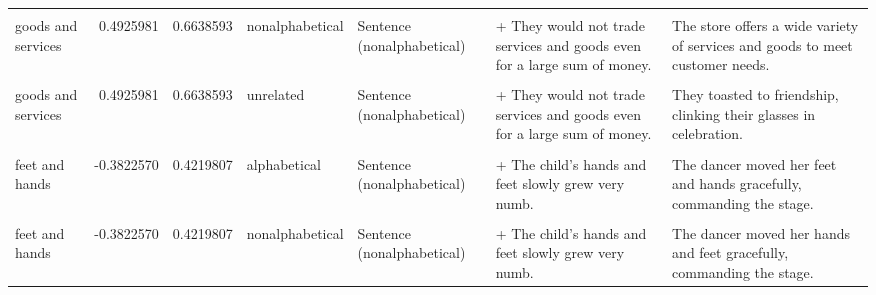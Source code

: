 \documentclass[
  12pt,
]{scrartcl}
\begin{document}
\begin{landscape}
\begin{longtable}{lrrllll}
\addlinespace
\cellcolor{gray!6}{goods and services} & \cellcolor{gray!6}{0.4925981} & \cellcolor{gray!6}{0.6638593} & \cellcolor{gray!6}{nonalphabetical} & \cellcolor{gray!6}{Sentence (alphabetical)} & \cellcolor{gray!6}{+ They would not trade goods and services even for a large sum of money.} & \cellcolor{gray!6}{The store offers a wide variety of services and goods to meet customer needs.}\\
goods and services & 0.4925981 & 0.6638593 & nonalphabetical & Sentence (nonalphabetical) & + They would not trade services and goods even for a large sum of money. & The store offers a wide variety of services and goods to meet customer needs.\\
\cellcolor{gray!6}{goods and services} & \cellcolor{gray!6}{0.4925981} & \cellcolor{gray!6}{0.6638593} & \cellcolor{gray!6}{unrelated} & \cellcolor{gray!6}{Sentence (alphabetical)} & \cellcolor{gray!6}{+ They would not trade goods and services even for a large sum of money.} & \cellcolor{gray!6}{They toasted to friendship, clinking their glasses in celebration.}\\
goods and services & 0.4925981 & 0.6638593 & unrelated & Sentence (nonalphabetical) & + They would not trade services and goods even for a large sum of money. & They toasted to friendship, clinking their glasses in celebration.\\
\cellcolor{gray!6}{feet and hands} & \cellcolor{gray!6}{-0.3822570} & \cellcolor{gray!6}{0.4219807} & \cellcolor{gray!6}{alphabetical} & \cellcolor{gray!6}{Sentence (alphabetical)} & \cellcolor{gray!6}{+ The child's feet and hands slowly grew very numb.} & \cellcolor{gray!6}{The dancer moved her feet and hands gracefully, commanding the stage.}\\
\addlinespace
feet and hands & -0.3822570 & 0.4219807 & alphabetical & Sentence (nonalphabetical) & + The child's hands and feet slowly grew very numb. & The dancer moved her feet and hands gracefully, commanding the stage.\\
\cellcolor{gray!6}{feet and hands} & \cellcolor{gray!6}{-0.3822570} & \cellcolor{gray!6}{0.4219807} & \cellcolor{gray!6}{nonalphabetical} & \cellcolor{gray!6}{Sentence (alphabetical)} & \cellcolor{gray!6}{+ The child's feet and hands slowly grew very numb.} & \cellcolor{gray!6}{The dancer moved her hands and feet gracefully, commanding the stage.}\\
feet and hands & -0.3822570 & 0.4219807 & nonalphabetical & Sentence (nonalphabetical) & + The child's hands and feet slowly grew very numb. & The dancer moved her hands and feet gracefully, commanding the stage.\\

\end{longtable}
\end{landscape}
\end{document}

